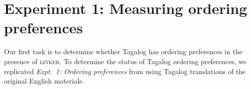 \documentclass[12pt,letterpaper]{article}
\begin{document}




\section{Experiment 1: Measuring ordering preferences} \label{expt1}

Our first task is to determine whether Tagalog has ordering preferences in the presence of \textsc{linker}. To determine the status of Tagalog ordering preferences, we replicated \emph{Expt.~1: Ordering preferences} from \cite{scontrasetal2017adjectives} using Tagalog translations of the original English materials.

\end{document}
